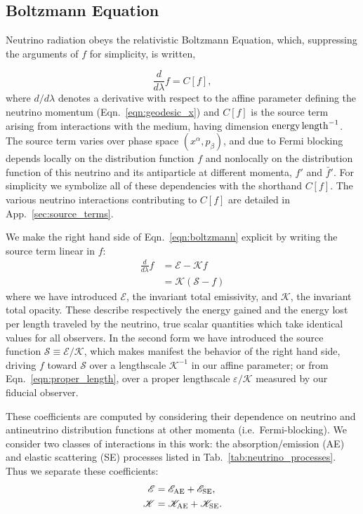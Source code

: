 \documentclass[aps,floatfix,prd,superscriptaddress,twocolumn]{revtex4-1}
\newcommand{\todo}[1]{\marginpar{\tiny{\textcolor{red}{#1}}}}
\renewcommand\todo[1]{} %
\begin{document}
\subsection{Boltzmann Equation}
\label{ssec:boltzmann}
Neutrino radiation obeys the relativistic Boltzmann Equation,
which, suppressing the arguments of $f$ for simplicity, is written,
\todo{point out limit of QKEs}
\begin{equation}
  \label{eqn:boltzmann}
  \frac{d}{d\lambda}f = C[f],
\end{equation}
where $d/d\lambda$ denotes a derivative with respect to the affine
parameter defining the neutrino momentum (Eqn.~\ref{eqn:geodesic_x})
and $C[f]$ is the source term arising from interactions with the medium,
having dimension ${\rm energy}\,{\rm length}^{-1}$.
The source term varies over phase space $(x^\alpha,p_\beta)$,
and due to Fermi blocking depends locally on the distribution function $f$
and nonlocally on the distribution function of this neutrino and its
antiparticle at different momenta, $f'$ and $\bar{f}'$.
For simplicity we symbolize all of these dependencies with the shorthand $C[f]$.
The various neutrino interactions contributing to $C[f]$ are detailed in
App.~\ref{sec:source_terms}.

We make the right hand side of Eqn.~\ref{eqn:boltzmann} explicit by writing
the source term linear in $f$:
\begin{align}
  \label{eqn:boltzmann_linear}
  \frac{d}{d\lambda}f &=
  \mathscr{E} - \mathscr{K} f \\
  \label{eqn:boltzmann_linear_s}
  &= \mathscr{K}(\mathscr{S}-f)
\end{align}
where we have introduced
$\mathscr{E}$, the invariant total emissivity, and
$\mathscr{K}$, the invariant total opacity.
These describe respectively the energy gained and the energy lost
per length traveled by the neutrino, true scalar quantities
which take identical values for all observers.
In the second form we have introduced the source function
$\mathscr{S}\equiv\mathscr{E}/\mathscr{K}$, which makes manifest the
behavior of the right hand side, driving $f$ toward $\mathscr{S}$
over a lengthscale $\mathscr{K}^{-1}$ in our affine parameter;
or from Eqn.~\ref{eqn:proper_length}, over a proper lengthscale
$\varepsilon/\mathscr{K}$ measured by our fiducial observer.

These coefficients are computed by considering their dependence
on neutrino and antineutrino distribution functions at other momenta
(i.e.\ Fermi-blocking).
We consider two classes of interactions in this work:
the absorption/emission (AE) and elastic scattering (SE) processes
listed in Tab.~\ref{tab:neutrino_processes}.
Thus we separate these coefficients:
\begin{align}
  \label{eqn:inv_emissivity_components}
  \mathscr{E} &= \mathscr{E}_{\rm AE} + \mathscr{E}_{\rm SE},\\
  \label{eqn:inv_opacity_components}
  \mathscr{K} &= \mathscr{K}_{\rm AE} + \mathscr{K}_{\rm SE}.
\end{align}
\end{document}
